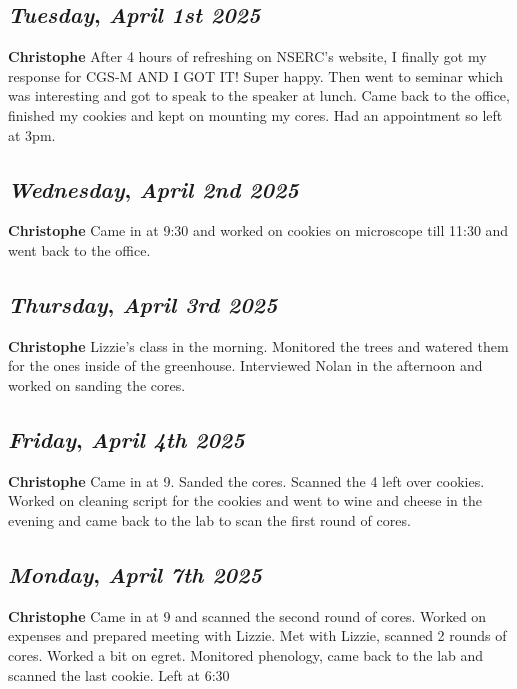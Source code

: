 \begin{center}
\section*{\month}
\end{center}

\def\day{\textit{April 1st 2025}}
\def\weekday{\textit{Tuesday}}
\subsection*{\weekday, \day}
\textbf {Christophe}
After 4 hours of refreshing on NSERC's website, I finally got my response for CGS-M AND I GOT IT! Super happy. Then went to seminar which was interesting and got to speak to the speaker at lunch. Came back to the office, finished my cookies and kept on mounting my cores. Had an appointment so left at 3pm.

\def\day{\textit{April 2nd 2025}}
\def\weekday{\textit{Wednesday}}
\subsection*{\weekday, \day}
\textbf {Christophe}
Came in at 9:30 and worked on cookies on microscope till 11:30 and went back to the office. 

\def\day{\textit{April 3rd 2025}}
\def\weekday{\textit{Thursday}}
\subsection*{\weekday, \day}
\textbf {Christophe}
Lizzie's class in the morning. Monitored the trees and watered them for the ones inside of the greenhouse. Interviewed Nolan in the afternoon and worked on sanding the cores.

\def\day{\textit{April 4th 2025}}
\def\weekday{\textit{Friday}}
\subsection*{\weekday, \day}
\textbf {Christophe}
Came in at 9. Sanded the cores. Scanned the 4 left over cookies. Worked on cleaning script for the cookies and went to wine and cheese in the evening and came back to the lab to scan the first round of cores.

\def\day{\textit{April 7th 2025}}
\def\weekday{\textit{Monday}}
\subsection*{\weekday, \day}
\textbf {Christophe}
Came in at 9 and scanned the second round of cores. Worked on expenses and prepared meeting with Lizzie. Met with Lizzie, scanned 2 rounds of cores. Worked a bit on egret. Monitored phenology, came back to the lab and scanned the last cookie. Left at 6:30
\def\day{\textit{April 8th 2025}}
\def\weekday{\textit{Tuesday}}

